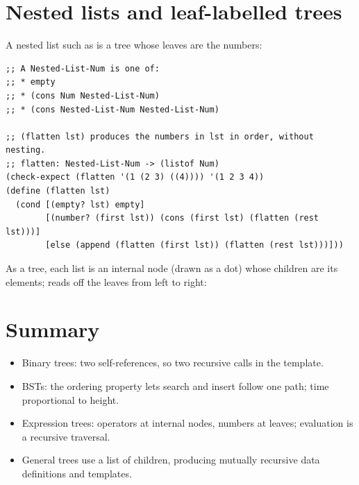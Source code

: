 \section{Nested lists and leaf-labelled trees}
A nested list such as  is a tree whose leaves are the
numbers:
\begin{lstlisting}[style=racket]
;; A Nested-List-Num is one of:
;; * empty
;; * (cons Num Nested-List-Num)
;; * (cons Nested-List-Num Nested-List-Num)

;; (flatten lst) produces the numbers in lst in order, without nesting.
;; flatten: Nested-List-Num -> (listof Num)
(check-expect (flatten '(1 (2 3) ((4)))) '(1 2 3 4))
(define (flatten lst)
  (cond [(empty? lst) empty]
        [(number? (first lst)) (cons (first lst) (flatten (rest lst)))]
        [else (append (flatten (first lst)) (flatten (rest lst)))]))
\end{lstlisting}

As a tree, each list is an internal node (drawn as a dot) whose children are
its elements;  reads off the leaves from left to right:

\begin{center}
\end{center}

\section{Summary}
\begin{itemize}
  \item Binary trees: two self-references, so two recursive calls in the template.
  \item BSTs: the ordering property lets search and insert follow one path; time proportional to height.
  \item Expression trees: operators at internal nodes, numbers at leaves; evaluation is a recursive traversal.
  \item General trees use a list of children, producing mutually recursive data definitions and templates.
\end{itemize}
